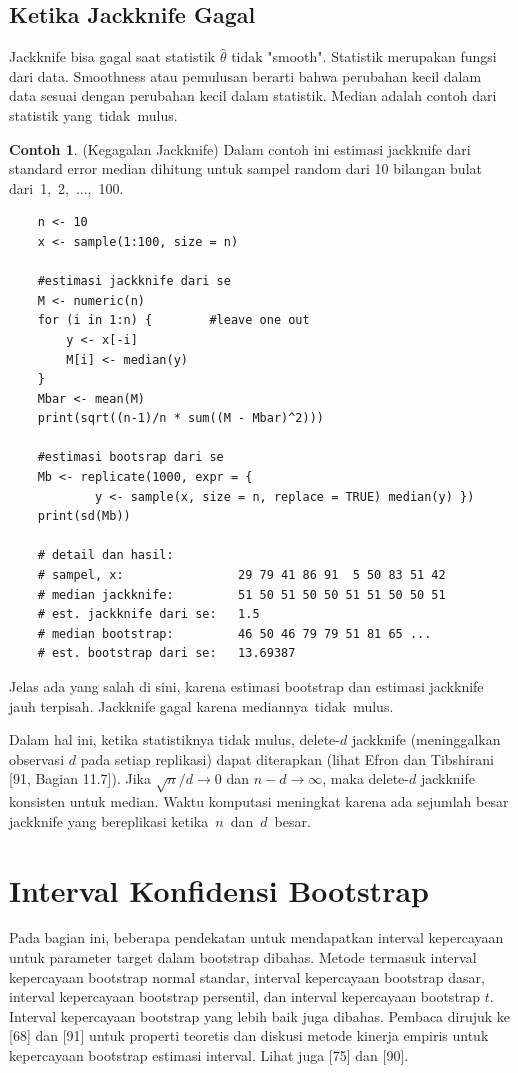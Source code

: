 \documentclass[a4paper,12pt]{article}
\theoremstyle{definition}
\newtheorem{example}{Contoh}[section]
\begin{document}
\subsection{Ketika Jackknife Gagal}
Jackknife bisa gagal saat statistik $\hat{\theta}$ tidak "smooth". Statistik merupakan fungsi dari data. Smoothness atau pemulusan berarti bahwa perubahan kecil dalam data sesuai dengan perubahan kecil dalam statistik. Median adalah contoh dari statistik yang tidak mulus.
\begin{example}(Kegagalan Jackknife)
Dalam contoh ini estimasi jackknife dari standard error median dihitung untuk sampel random dari 10 bilangan bulat dari 1, 2, ..., 100.
\begin{lstlisting}
    n <- 10
    x <- sample(1:100, size = n)

    #estimasi jackknife dari se
    M <- numeric(n)
    for (i in 1:n) {        #leave one out
        y <- x[-i]
        M[i] <- median(y)
    }
    Mbar <- mean(M)
    print(sqrt((n-1)/n * sum((M - Mbar)^2)))

    #estimasi bootsrap dari se
    Mb <- replicate(1000, expr = {
            y <- sample(x, size = n, replace = TRUE) median(y) })
    print(sd(Mb))

    # detail dan hasil:
    # sampel, x:                29 79 41 86 91  5 50 83 51 42
    # median jackknife:         51 50 51 50 50 51 51 50 50 51
    # est. jackknife dari se:   1.5
    # median bootstrap:         46 50 46 79 79 51 81 65 ...
    # est. bootstrap dari se:   13.69387
\end{lstlisting}
Jelas ada yang salah di sini, karena estimasi bootstrap dan estimasi jackknife jauh terpisah. Jackknife gagal karena mediannya tidak mulus. 

Dalam hal ini, ketika statistiknya tidak mulus, delete-$d$ jackknife (meninggalkan observasi $d$ pada setiap replikasi) dapat diterapkan (lihat Efron dan Tibshirani [91, Bagian 11.7]). Jika $\sqrt{n}/d\rightarrow0$ dan $n-d\rightarrow\infty$, maka delete-$d$ jackknife konsisten untuk median. Waktu komputasi meningkat karena ada sejumlah besar jackknife yang bereplikasi ketika $n$ dan $d$ besar.
\end{example}

\section{Interval Konfidensi Bootstrap}
Pada bagian ini, beberapa pendekatan untuk mendapatkan interval kepercayaan untuk parameter target dalam bootstrap dibahas. Metode termasuk interval kepercayaan bootstrap normal standar, interval kepercayaan bootstrap dasar, interval kepercayaan bootstrap persentil, dan interval kepercayaan bootstrap $t$. Interval kepercayaan bootstrap yang lebih baik juga dibahas. Pembaca dirujuk ke [68] dan [91] untuk properti teoretis dan diskusi metode kinerja empiris untuk kepercayaan bootstrap estimasi interval. Lihat juga [75] dan [90].
\end{document}
